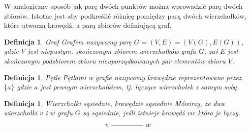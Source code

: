 \documentclass[12pt,a4paper]{report}
\newtheorem{definition}[theorem]{Definicja}
\begin{document}
W analogiczny sposób jak parę dwóch punktów można wprowadzić parę dwóch zbiorów. Istotne jest aby podkreślić różnicę pomiędzy parą dwóch wierzchołków, które utworzą krawędź, a parą zbiorów definiującą graf. 


\begin{definition}{Graf \cite[w oparciu o rozdział 2]{wilson2008}}
Grafem nazywamy parę $G=(V,E)=(V(G),E(G))$, gdzie $V$ jest niepustym, skończonym zbiorem wierzchołków grafu $G$, zaś $E$ jest skończonym podzbiorem zbioru nieuporządkowanych par elementów zbioru $V$.
\end{definition}


\begin{definition}{Pętle \cite[Rozdział 2]{wilson2008}}
Pętlami w grafie nazywamy krawędzie reprezentowane przez $\{a\}$ gdzie $a$ jest pewnym wierzchołkiem, tj. łączące wierzchołek z samym sobą.
\end{definition}


\begin{definition}{Wierzchołki sąsiednie, krawędzie sąsiednie \cite[Rozdział 2]{wilson2008}}
Mówimy, że dwa wierzchołki $v$ i $w$ grafu $G$ są sąsiednie, jeśli istnieje krawędź $vw$ która je łączy. 
$$
\begin{tikzpicture}[scale=.7]
  \node (v) at (-2,0) {$v$};
  \node (w) at (1,0) {$w$};
  \draw (v)--(w); 
  
\end{tikzpicture}
$$
\end{definition}
\end{document}
